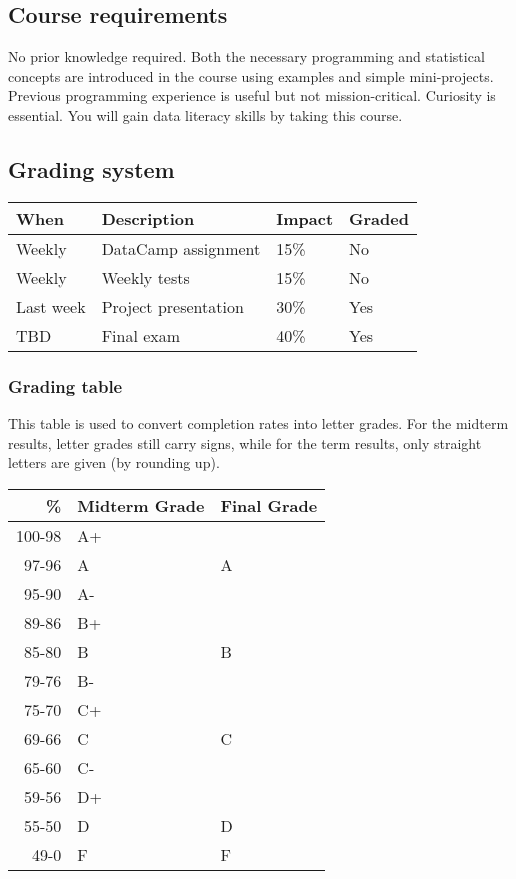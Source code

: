 \documentclass[11pt]{article}
\begin{document}
\subsection{Course requirements}
\label{sec:org6cc9362}

No prior knowledge required. Both the necessary programming and
statistical concepts are introduced in the course using examples and
simple mini-projects. Previous programming experience is useful but
not mission-critical. Curiosity is essential. You will gain data
literacy skills by taking this course.

\subsection{Grading system}
\label{sec:orge0bac37}

\begin{center}
\begin{tabular}{llll}
\hline
When & Description & Impact & Graded\\
\hline
Weekly & DataCamp assignment & 15\% & No\\
Weekly & Weekly tests & 15\% & No\\
Last week & Project presentation & 30\% & Yes\\
TBD & Final exam & 40\% & Yes\\
\hline
\end{tabular}
\end{center}

\subsubsection{Grading table}
\label{sec:orga3a96ea}

This table is used to convert completion rates into letter
grades. For the midterm results, letter grades still carry signs,
while for the term results, only straight letters are given (by
rounding up).

\begin{center}
\begin{tabular}{rll}
\hline
\textbf{\%} & \textbf{Midterm Grade} & \textbf{Final Grade}\\
\hline
100-98 & A+ & \\
97-96 & A & A\\
95-90 & A- & \\
\hline
89-86 & B+ & \\
85-80 & B & B\\
79-76 & B- & \\
\hline
75-70 & C+ & \\
69-66 & C & C\\
65-60 & C- & \\
\hline
59-56 & D+ & \\
55-50 & D & D\\
\hline
49-0 & F & F\\
\hline
\end{tabular}
\end{center}
\end{document}
